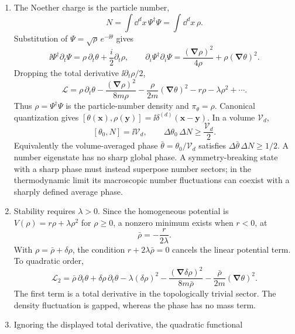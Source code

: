\begin{enumerate}
  \begin{enumerate}
    \item[(a)]
    The Noether charge is the particle number,
    \[
      N=\int \dd^dx\,\Psi^\dagger\Psi=\int \dd^dx\,\rho.
    \]
    Substitution of \(\Psi=\sqrt\rho\,e^{-\ii\theta}\) gives
    \[
      \ii\Psi^\dagger\partial_t\Psi
        =\rho\,\partial_t\theta+\frac i2\partial_t\rho,
      \qquad
      \partial_i\Psi^\dagger\partial_i\Psi
        =\frac{(\boldsymbol\nabla\rho)^2}{4\rho}
          +\rho(\boldsymbol\nabla\theta)^2.
    \]
    Dropping the total derivative \(\ii\partial_t\rho/2\),
    \[
      \mathcal L
        =\rho\,\partial_t\theta
         -\frac{(\boldsymbol\nabla\rho)^2}{8m\rho}
         -\frac{\rho}{2m}(\boldsymbol\nabla\theta)^2
         -r\rho-\lambda\rho^2+\cdots .
    \]
    Thus \(\rho=\Psi^\dagger\Psi\) is the particle-number density and
    \(\pi_\theta=\rho\).  Canonical quantization gives
    \([\theta(\mathbf x),\rho(\mathbf y)]=\ii\delta^{(d)}(\mathbf x-\mathbf y)\).
    In a volume \(\mathcal V_d\),
    \[
      [\theta_0,N]=\ii\mathcal V_d,
      \qquad
      \Delta\theta_0\,\Delta N\ge\frac{\mathcal V_d}{2}.
    \]
    Equivalently the volume-averaged phase
    \(\bar\theta=\theta_0/\mathcal V_d\) satisfies
    \(\Delta\bar\theta\,\Delta N\ge1/2\).  A number eigenstate has no sharp
    global phase.  A symmetry-breaking state with a sharp phase must instead
    superpose number sectors; in the thermodynamic limit its macroscopic
    number fluctuations can coexist with a sharply defined average phase.
    \item[(b)]
    Stability requires \(\lambda>0\).  Since the homogeneous potential is
    \(V(\rho)=r\rho+\lambda\rho^2\) for \(\rho\ge0\), a nonzero minimum
    exists when \(r<0\), at
    \[
      \bar\rho=-\frac r{2\lambda}.
    \]
    With \(\rho=\bar\rho+\delta\rho\), the condition
    \(r+2\lambda\bar\rho=0\) cancels the linear potential term.  To quadratic
    order,
    \[
      \mathcal L_2
        =\bar\rho\,\partial_t\theta
         +\delta\rho\,\partial_t\theta
         -\lambda(\delta\rho)^2
         -\frac{(\boldsymbol\nabla\delta\rho)^2}{8m\bar\rho}
         -\frac{\bar\rho}{2m}(\boldsymbol\nabla\theta)^2.
    \]
    The first term is a total derivative in the topologically trivial sector.
    The density fluctuation is gapped, whereas the phase has no mass term.
    \item[(c)]
    Ignoring the displayed total derivative, the quadratic functional

\end{enumerate}
\end{enumerate}
